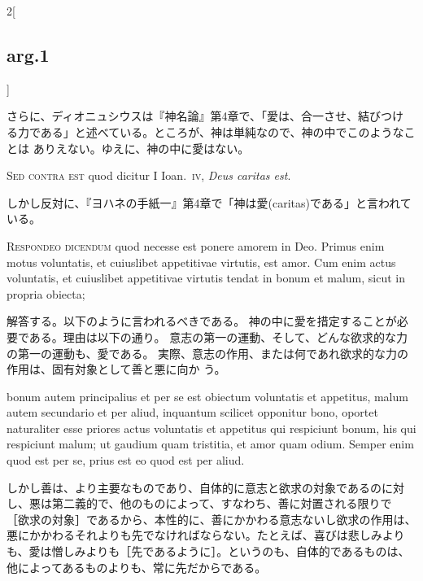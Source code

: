 \documentclass[paper=a4paper,fontsize=10pt,jafontsize=9pt,titlepage]{jlreq}
\begin{document}
\begin{paracol}{2}[\subsection{arg.1}]
\switchcolumn

さらに、ディオニュシウスは『神名論』第4章で、「愛は、合一させ、結びつけ
 る力である」と述べている。ところが、神は単純なので、神の中でこのようなことは
 ありえない。ゆえに、神の中に愛はない。

\switchcolumn*[\subsection{s.c.}]


{\scshape Sed contra est} quod dicitur I Ioan.~{\scshape iv}, {\itshape Deus
caritas est}.

\switchcolumn

しかし反対に、『ヨハネの手紙一』第4章で「神は愛(caritas)である」と言われている。



{\scshape Respondeo dicendum} quod necesse est ponere
amorem in Deo. Primus enim motus voluntatis, et cuiuslibet appetitivae
virtutis, est amor. Cum enim actus voluntatis, et cuiuslibet appetitivae
virtutis tendat in bonum et malum, sicut in propria obiecta;

\switchcolumn

解答する。以下のように言われるべきである。
神の中に愛を措定することが必要である。理由は以下の通り。
意志の第一の運動、そして、どんな欲求的な力の第一の運動も、愛である。
実際、意志の作用、または何であれ欲求的な力の作用は、固有対象として善と悪に向か
 う。

\switchcolumn*


bonum autem
principalius et per se est obiectum voluntatis et appetitus, malum autem
secundario et per aliud, inquantum scilicet opponitur bono, oportet
naturaliter esse priores actus voluntatis et appetitus qui respiciunt
bonum, his qui respiciunt malum; ut gaudium quam tristitia, et amor quam
odium. Semper enim quod est per se, prius est eo quod est per
aliud.

\switchcolumn

しかし善は、より主要なものであり、自体的に意志と欲求の対象であるのに対
 し、悪は第二義的で、他のものによって、すなわち、善に対置される限りで
 ［欲求の対象］であるから、本性的に、善にかかわる意志ないし欲求の作用は、
 悪にかかわるそれよりも先でなければならない。たとえば、喜びは悲しみより
 も、愛は憎しみよりも［先であるように］。というのも、自体的であるものは、
 他によってあるものよりも、常に先だからである。


\end{paracol}
\end{document}
